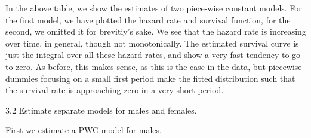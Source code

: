 \documentclass[
]{article}
\begin{document}
In the above table, we show the estimates of two piece-wise constant
models. For the first model, we have plotted the hazard rate and
survival function, for the second, we omitted it for brevitiy's sake. We
see that the hazard rate is increasing over time, in general, though not
monotonically. The estimated survival curve is just the integral over
all these hazard rates, and show a very fast tendency to go to zero. As
before, this makes sense, as this is the case in the data, but piecewise
dummies focusing on a small first period make the fitted distribution
such that the survival rate is approaching zero in a very short period.

\clearpage

3.2 Estimate separate models for males and females.

First we estimate a PWC model for males.
\end{document}
